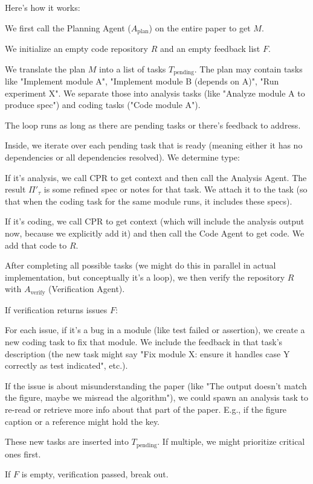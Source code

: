 \documentclass{ieeeaccess}
\begin{document}
Here's how it works:

We first call the Planning Agent ($A_{\text{plan}}$) on the entire paper to get $M$.

We initialize an empty code repository $R$ and an empty feedback list $F$.

We translate the plan $M$ into a list of tasks $T_{\text{pending}}$. The plan may contain tasks like "Implement module A", "Implement module B (depends on A)", "Run experiment X". We separate those into analysis tasks (like "Analyze module A to produce spec") and coding tasks ("Code module A").

The loop runs as long as there are pending tasks or there's feedback to address.

Inside, we iterate over each pending task that is ready (meaning either it has no dependencies or all dependencies resolved). We determine type:

If it's analysis, we call CPR to get context and then call the Analysis Agent. The result $\Pi'_\tau$ is some refined spec or notes for that task. We attach it to the task (so that when the coding task for the same module runs, it includes these specs).

If it's coding, we call CPR to get context (which will include the analysis output now, because we explicitly add it) and then call the Code Agent to get code. We add that code to $R$.

After completing all possible tasks (we might do this in parallel in actual implementation, but conceptually it's a loop), we then verify the repository $R$ with $A_{\text{verify}}$ (Verification Agent).

If verification returns issues $F$:

For each issue, if it's a bug in a module (like test failed or assertion), we create a new coding task to fix that module. We include the feedback in that task's description (the new task might say "Fix module X: ensure it handles case Y correctly as test indicated", etc.).

If the issue is about misunderstanding the paper (like "The output doesn't match the figure, maybe we misread the algorithm"), we could spawn an analysis task to re-read or retrieve more info about that part of the paper. E.g., if the figure caption or a reference might hold the key.

These new tasks are inserted into $T_{\text{pending}}$. If multiple, we might prioritize critical ones first.

If $F$ is empty, verification passed, break out.
\end{document}
